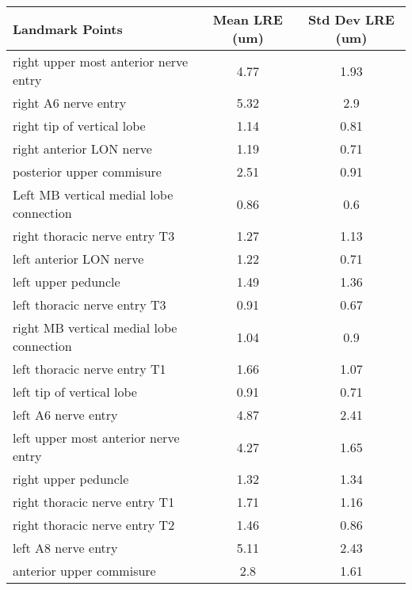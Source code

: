\begin{tabular}{lcc}
\hline
 ﻿Landmark Points                            & Mean LRE (um) & Std Dev LRE (um) \\ \hline \hline
 right upper most anterior nerve entry       & 4.77          & 1.93             \\
 right A6 nerve entry                        & 5.32          & 2.9              \\
 right tip of vertical lobe                  & 1.14          & 0.81             \\
 right anterior LON nerve                    & 1.19          & 0.71             \\
 posterior upper commisure                   & 2.51          & 0.91             \\
 Left MB vertical medial lobe connection     & 0.86          & 0.6              \\
 right thoracic nerve entry T3               & 1.27          & 1.13             \\
 left anterior LON nerve                     & 1.22          & 0.71             \\
 left upper peduncle                         & 1.49          & 1.36             \\
 left thoracic nerve entry T3                & 0.91          & 0.67             \\
 right MB vertical medial lobe connection    & 1.04          & 0.9              \\
 left thoracic nerve entry T1                & 1.66          & 1.07             \\
 left tip of vertical lobe                   & 0.91          & 0.71             \\
 left A6 nerve entry                         & 4.87          & 2.41             \\
 left upper most anterior nerve entry        & 4.27          & 1.65             \\
 right upper peduncle                        & 1.32          & 1.34             \\
 right thoracic nerve entry T1               & 1.71          & 1.16             \\
 right thoracic nerve entry T2               & 1.46          & 0.86             \\
 left A8 nerve entry                         & 5.11          & 2.43             \\
 anterior upper commisure                    & 2.8           & 1.61             \\

\end{tabular}
